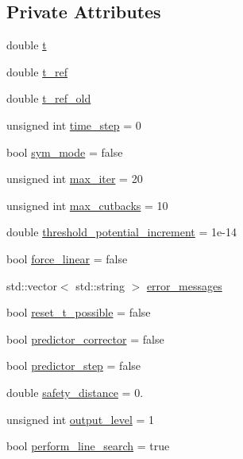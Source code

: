 \subsection*{Private Attributes}
\begin{DoxyCompactItemize}
\item 
double \hyperlink{classincremental_f_e_1_1_global_data_incremental_f_e_abb14e15389af3772905a3c75e12ed2c0}{t}
\item 
double \hyperlink{classincremental_f_e_1_1_global_data_incremental_f_e_a6ddf751a2f8abff9353d12e469e38f96}{t\+\_\+ref}
\item 
double \hyperlink{classincremental_f_e_1_1_global_data_incremental_f_e_ad808aad6cdbfa6eddad05fb85c056d11}{t\+\_\+ref\+\_\+old}
\item 
unsigned int \hyperlink{classincremental_f_e_1_1_global_data_incremental_f_e_a2aa7544464ad55c39f44c9e7e04b4bf6}{time\+\_\+step} = 0
\item 
bool \hyperlink{classincremental_f_e_1_1_global_data_incremental_f_e_a9986ee5bfccc1b5936c585cf0c5a4474}{sym\+\_\+mode} = false
\item 
unsigned int \hyperlink{classincremental_f_e_1_1_global_data_incremental_f_e_ad15c334652b6a9d6843c360c6e2005ec}{max\+\_\+iter} = 20
\item 
unsigned int \hyperlink{classincremental_f_e_1_1_global_data_incremental_f_e_a7ae58573e9cc241a14976bf19351ba63}{max\+\_\+cutbacks} = 10
\item 
double \hyperlink{classincremental_f_e_1_1_global_data_incremental_f_e_a2f7adb8b4f7f8875715e1dbd0edd9ac8}{threshold\+\_\+potential\+\_\+increment} = 1e-\/14
\item 
bool \hyperlink{classincremental_f_e_1_1_global_data_incremental_f_e_a37c1d42902e74f13f3c4ba82d2dabd67}{force\+\_\+linear} = false
\item 
std\+::vector$<$ std\+::string $>$ \hyperlink{classincremental_f_e_1_1_global_data_incremental_f_e_a47301f72bcb3852b2519b23de833f3eb}{error\+\_\+messages}
\item 
bool \hyperlink{classincremental_f_e_1_1_global_data_incremental_f_e_a23a3040aa83a8867ccb0a8e88bb8cb9e}{reset\+\_\+t\+\_\+possible} = false
\item 
bool \hyperlink{classincremental_f_e_1_1_global_data_incremental_f_e_a5cc0d20e5e389c149bbd288f57dee953}{predictor\+\_\+corrector} = false
\item 
bool \hyperlink{classincremental_f_e_1_1_global_data_incremental_f_e_afe172fdb882f9dd0cd5f963386dd2ffb}{predictor\+\_\+step} = false
\item 
double \hyperlink{classincremental_f_e_1_1_global_data_incremental_f_e_a6db92e8e97c6875df1ecf5aa2a3a0345}{safety\+\_\+distance} = 0.
\item 
unsigned int \hyperlink{classincremental_f_e_1_1_global_data_incremental_f_e_a0d5cf3ecf70ec61771bbcfe45d0e6b5d}{output\+\_\+level} = 1
\item 
bool \hyperlink{classincremental_f_e_1_1_global_data_incremental_f_e_a2253a9b142315cbccac38c8b8dc83824}{perform\+\_\+line\+\_\+search} = true
\end{DoxyCompactItemize}
